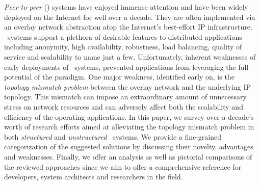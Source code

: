 \emph{Peer-to-peer} (\p) systems have enjoyed immense attention and have been
widely deployed on the Internet for well over a decade.
They are often implemented via an overlay network abstraction
atop the Internet's best-effort IP infrastructure. 
\p\ systems support a plethora of desirable features to
distributed applications including
anonymity, high availability, robustness, 
load balancing, quality of service and scalability to name just a few.
Unfortunately, inherent weaknesses 
of early deployments of \p\ systems, prevented 
applications from leveraging the full potential of the paradigm.
One major weakness, identified early on, 
is the \emph{topology mismatch problem}
between the overlay network and the underlying IP topology.
This mismatch can impose an extraordinary amount of unnecessary stress on
network resources and can adversely affect 
both the scalability and efficiency of the operating applications.
In this paper, we survey over a decade's worth of research efforts
aimed at alleviating the topology mismatch problem in both 
\emph{structured} and \emph{unstructured} \p\ systems.   
We provide a fine-grained categorization of the suggested solutions
by discussing their novelty, advantages and weaknesses.
Finally, we offer an analysis as well as pictorial comparisons 
of the reviewed approaches since we aim to offer a comprehensive
reference for developers, system architects and researchers in the field.
